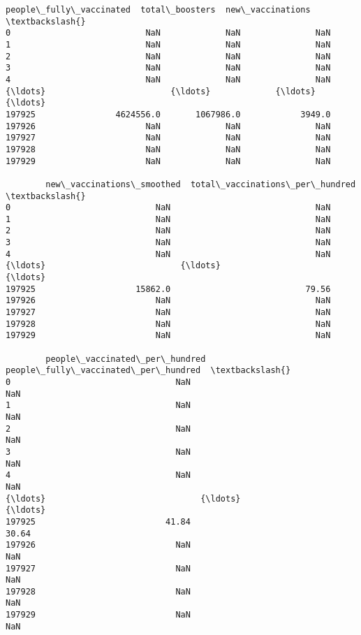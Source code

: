 \documentclass[11pt]{article}
\begin{document}
\begin{tcolorbox}[breakable, size=fbox, boxrule=.5pt, pad at break*=1mm, opacityfill=0]
\begin{Verbatim}[commandchars=\\\{\}]
        people\_fully\_vaccinated  total\_boosters  new\_vaccinations  \textbackslash{}
0                           NaN             NaN               NaN
1                           NaN             NaN               NaN
2                           NaN             NaN               NaN
3                           NaN             NaN               NaN
4                           NaN             NaN               NaN
{\ldots}                         {\ldots}             {\ldots}               {\ldots}
197925                4624556.0       1067986.0            3949.0
197926                      NaN             NaN               NaN
197927                      NaN             NaN               NaN
197928                      NaN             NaN               NaN
197929                      NaN             NaN               NaN

        new\_vaccinations\_smoothed  total\_vaccinations\_per\_hundred  \textbackslash{}
0                             NaN                             NaN
1                             NaN                             NaN
2                             NaN                             NaN
3                             NaN                             NaN
4                             NaN                             NaN
{\ldots}                           {\ldots}                             {\ldots}
197925                    15862.0                           79.56
197926                        NaN                             NaN
197927                        NaN                             NaN
197928                        NaN                             NaN
197929                        NaN                             NaN

        people\_vaccinated\_per\_hundred  people\_fully\_vaccinated\_per\_hundred  \textbackslash{}
0                                 NaN                                  NaN
1                                 NaN                                  NaN
2                                 NaN                                  NaN
3                                 NaN                                  NaN
4                                 NaN                                  NaN
{\ldots}                               {\ldots}                                  {\ldots}
197925                          41.84                                30.64
197926                            NaN                                  NaN
197927                            NaN                                  NaN
197928                            NaN                                  NaN
197929                            NaN                                  NaN


\end{Verbatim}
\end{tcolorbox}
\end{document}
